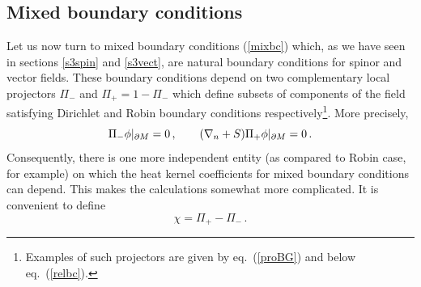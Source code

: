 \subsection{Mixed boundary conditions}\label{s5mixed}
Let us now turn to mixed boundary conditions (\ref{mixbc}) which,
as we have seen in sections \ref{s3spin} and \ref{s3vect}, are
natural boundary conditions for spinor and vector fields.  
These boundary conditions depend on two complementary local
projectors $\Pi_-$ and $\Pi_+=1-\Pi_-$ which define subsets
of components of the field satisfying Dirichlet and Robin
boundary conditions respectively\footnote{Examples of such projectors
are given by eq.\ (\ref{proBG}) and below eq.\ (\ref{relbc}).}.
More precisely,
\begin{equation}
\Pi_-\phi \vert_{\partial M} =0\,,\qquad (\nabla_n+S)\Pi_+\phi \vert_{\partial M} =0\,.\label{mixagain}
\end{equation}
Consequently, there is one more independent entity (as compared to Robin
case, for example) on which the heat kernel coefficients for mixed 
boundary conditions can depend. This makes the calculations somewhat
more complicated. It is convenient to define
\begin{equation}
\chi = \Pi_+-\Pi_- \,.\label{defchi}
\end{equation}

